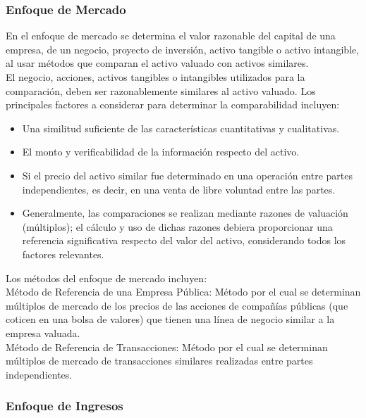 \subsubsection{Enfoque de Mercado}

En el enfoque de mercado se determina el valor razonable del capital de una empresa, de un negocio, proyecto de inversi\'on, activo tangible o activo intangible, al usar m\'etodos que comparan el activo valuado con activos similares.\\[10pt]

El negocio, acciones, activos tangibles o intangibles utilizados para la comparaci\'on, deben ser razonablemente similares al activo valuado. Los principales factores a considerar para determinar la comparabilidad incluyen:\\[10pt]

\begin{itemize}

\item Una similitud suficiente de las caracter\'isticas cuantitativas y cualitativas.
\item El monto y verificabilidad de la informaci\'on respecto del activo.
\item Si el precio del activo similar fue determinado en una operaci\'on entre partes independientes, es decir, en una venta de libre voluntad entre las partes.
\item Generalmente, las comparaciones se realizan mediante razones de valuaci\'on (m\'ultiplos); el c\'alculo y uso de dichas razones debiera proporcionar una referencia significativa respecto del valor del activo, considerando todos los factores relevantes.
\end{itemize}

Los m\'etodos del enfoque de mercado incluyen:\\[10pt]

\textcolor{secundario}{M\'etodo de Referencia de una Empresa P\'ublica}: M\'etodo por el cual se determinan m\'ultiplos de mercado de los precios de las acciones de compa\~n\'ias p\'ublicas (que coticen en una bolsa de valores) que tienen una l\'inea de negocio similar a la empresa valuada.\\[10pt]

\textcolor{secundario}{M\'etodo de Referencia de Transacciones}: M\'etodo por el cual se determinan m\'ultiplos de mercado de transacciones similares realizadas entre partes independientes.

\subsubsection{Enfoque de Ingresos}

